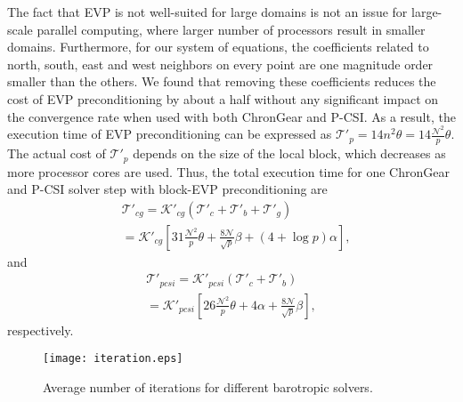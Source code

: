 The fact that EVP is not well-suited for large domains is not an issue for
large-scale parallel computing, where larger number of processors
result in smaller domains.  Furthermore, for our system of equations,
the coefficients related to north, south, east and west neighbors on
every point are one magnitude order smaller than the others. We found
that removing these coefficients reduces the cost of
EVP preconditioning by about a half without any significant
impact on the convergence rate when used with both ChronGear and
P-CSI.  As a result, the execution time of EVP preconditioning can be
expressed as $\mathcal{T'}_{p} = 14n^2\theta=
14\frac{\mathcal{N}^2}{p}\theta$.  The actual cost of
$\mathcal{T'}_{p}$ depends on the size of the local block, which
decreases as more processor cores are used.
Thus, the total execution time for one ChronGear and P-CSI solver step
with block-EVP preconditioning are
\begin{eqnarray}
\label{t_evppcg}
&\mathcal{T'}_{cg}=\mathcal{K'}_{cg} (\mathcal{T'}_c + \mathcal{T'}_b+\mathcal{T'}_g )\nonumber \\
&=\mathcal{K'}_{cg} [31 \frac{\mathcal{N}^2}{p}\theta + \frac{8\mathcal{N}}{\sqrt{p}}\beta +(4+\log p)\alpha],
\end{eqnarray}
and
\begin{eqnarray}
\label{t_evppsi}
\mathcal{T'}_{pcsi} = \mathcal{K'}_{pcsi}(\mathcal{T'}_c + \mathcal{T'}_b ) \nonumber \\
= \mathcal{K'}_{pcsi}[26\frac{\mathcal{N}^2}{p}\theta+ 4\alpha + \frac{8\mathcal{N}}{ \sqrt{p}}\beta],
\end{eqnarray}
respectively.

\begin {figure}[!t]
\centering
\texttt{[image: iteration.eps]}
\vspace{-.1in}
\caption[] {Average number of iterations for different barotropic solvers. \label{fig:iteration}}
\vspace{-.1in}
\end{figure}

